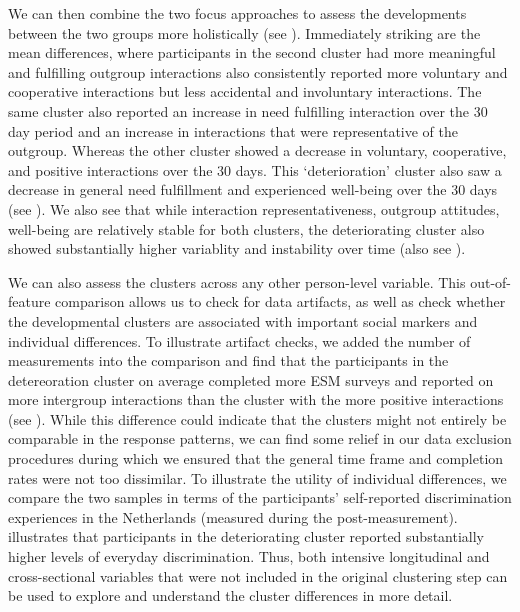 We can then combine the two focus approaches to assess the developments
between the two groups more holistically (see ).
Immediately striking are the mean differences, where participants in the
second cluster had more meaningful and fulfilling outgroup interactions
also consistently reported more voluntary and cooperative interactions
but less accidental and involuntary interactions. The same cluster also
reported an increase in need fulfilling interaction over the 30 day
period and an increase in interactions that were representative of the
outgroup. Whereas the other cluster showed a decrease in voluntary,
cooperative, and positive interactions over the 30 days. This
`deterioration' cluster also saw a decrease in general need fulfillment
and experienced well-being over the 30 days (see
). We also see that while interaction
representativeness, outgroup attitudes, well-being are relatively stable
for both clusters, the deteriorating cluster also showed substantially
higher variablity and instability over time (also see
).

We can also assess the clusters across any other person-level variable.
This out-of-feature comparison allows us to check for data artifacts, as
well as check whether the developmental clusters are associated with
important social markers and individual differences. To illustrate
artifact checks, we added the number of measurements into the comparison
and find that the participants in the detereoration cluster on average
completed more ESM surveys and reported on more intergroup interactions
than the cluster with the more positive interactions (see
). While this difference could indicate that
the clusters might not entirely be comparable in the response patterns,
we can find some relief in our data exclusion procedures during which we
ensured that the general time frame and completion rates were not too
dissimilar. To illustrate the utility of individual differences, we
compare the two samples in terms of the participants' self-reported
discrimination experiences in the Netherlands (measured during the
post-measurement).  illustrates that
participants in the deteriorating cluster reported substantially higher
levels of everyday discrimination. Thus, both intensive longitudinal and
cross-sectional variables that were not included in the original
clustering step can be used to explore and understand the cluster
differences in more detail.

